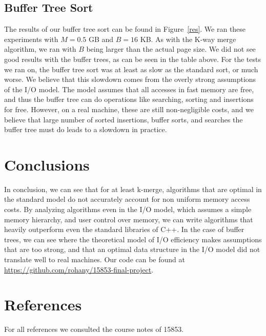\documentclass{article}
\begin{document}
\subsection{Buffer Tree Sort}

The results of our buffer tree sort can be found in Figure~\ref{res}.
%
We ran these experiments with $M = 0.5$ GB and $B = 16$ KB.
%
As with the K-way merge algorithm, we ran with $B$ being larger than the actual page size.
%
We did not see good results with the buffer trees, as can be seen in the table above.
%
For the tests we ran on, the buffer tree sort was at least as slow as the standard sort,
or much worse.
%
We believe that this slowdown comes from the overly strong assumptions of the I/O
model.
%
The model assumes that all accesses in fast memory are free, and thus the buffer tree
can do operations like searching, sorting and insertions for free.
%
However, on a real machine, these are still non-negligible costs, and we believe that
large number of sorted insertions, buffer sorts, and searches the buffer tree must do leads
to a slowdown in practice.

\section{Conclusions}

In conclusion, we can see that for at least k-merge,
algorithms that are optimal in the standard model do not accurately
account for non uniform memory access costs.
%
By analyzing algorithms even in the I/O model, which assumes
a simple memory hierarchy, and user control over memory,
we can write algorithms that heavily outperform
even the standard libraries of C++.
%
In the case of buffer trees, we can see where the theoretical model of
I/O efficiency makes assumptions that are too strong, and that an optimal
data structure in the I/O model did not translate well to real machines.
%
Our code can be found at \url{https://github.com/rohany/15853-final-project}.

\section{References}

For all references we consulted the course notes of 15853.
\end{document}
